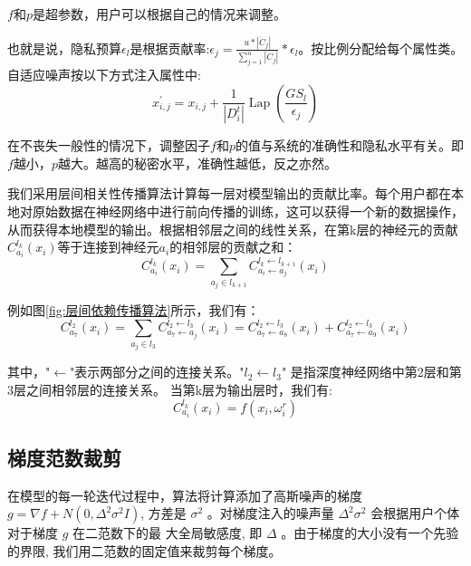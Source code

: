 $f$和$p$是超参数，用户可以根据自己的情况来调整。

也就是说，隐私预算$\epsilon_{l}$是根据贡献率:$\epsilon_{j}=\frac{u *\left|\ddot{C}_{j}\right|}{\sum_{j=1}^{u}\left|\ddot{C}_{j}\right|} * \epsilon_{l}$。按比例分配给每个属性类。自适应噪声按以下方式注入属性中:
\begin{equation}\label{eq:神经网络加噪3}
x_{i, j}^{\prime}=x_{i, j}+\frac{1}{\left|D_{i}^{t}\right|} \operatorname{Lap}\left(\frac{G S_{l}}{\epsilon_{j}}\right)
\end{equation}

在不丧失一般性的情况下，调整因子$f$和$p$的值与系统的准确性和隐私水平有关。即$f$越小，$p$越大。越高的秘密水平，准确性越低，反之亦然。

我们采用层间相关性传播算法计算每一层对模型输出的贡献比率。每个用户都在本地对原始数据在神经网络中进行前向传播的训练，这可以获得一个新的数据操作，从而获得本地模型的输出。根据相邻层之间的线性关系，在第k层的神经元的贡献$C_{a_{i}}^{l_{k}}\left(x_{i}\right)$等于连接到神经元$a_{i}$的相邻层的贡献之和：
\begin{equation}\label{eq:神经网络加噪4}
C_{a_{i}}^{l_{k}}\left(x_{i}\right)=\sum_{a_{j} \in l_{k+1}} C_{a_{i} \leftarrow a_{j}}^{l_{k} \leftarrow l_{k+1}}\left(x_{i}\right)
\end{equation}

例如图\ref{fig:层间依赖传播算法}所示，我们有：
\begin{equation}
C_{a_{7}}^{l_{2}}\left(x_{i}\right)=\sum_{a_{j} \in l_{3}} C_{a_{7} \leftarrow a_{j}}^{l_{2} \leftarrow l_{3}}\left(x_{i}\right)=C_{a_{7} \leftarrow a_{8}}^{l_{2} \leftarrow l_{3}}\left(x_{i}\right)+C_{a_{7} \leftarrow a_{9}}^{l_{2} \leftarrow l_{3}}\left(x_{i}\right)
\end{equation}

其中，"$\leftarrow$"表示两部分之间的连接关系。"$l_{2} \leftarrow l_{3}$" 是指深度神经网络中第2层和第3层之间相邻层的连接关系。
当第k层为输出层时，我们有:
\begin{equation}
C_{a_{i}}^{l_{k}}\left(x_{i}\right)=f\left(x_{i}, \omega_{i}^{r}\right)
\end{equation}

\subsection{梯度范数裁剪}
在模型的每一轮迭代过程中，算法将计算添加了高斯噪声的梯度$g=\nabla f+N\left(0, \Delta^{2} \sigma^{2} I\right)$, 方差是 $\sigma^{2}$ 。对梯度注入的噪声量 $\Delta^{2} \sigma^{2}$ 会根据用户个体对于梯度 $g$ 在二范数下的最 大全局敏感度, 即 $\Delta$ 。由于梯度的大小没有一个先验的界限, 我们用二范数的固定值来裁剪每个梯度。

